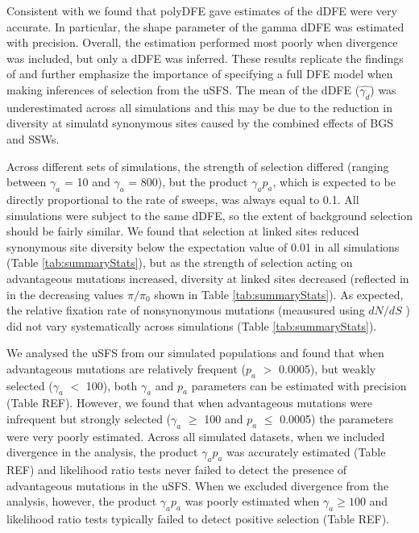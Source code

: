 \documentclass[11pt]{article}
\begin{document}
	Consistent with \cite{RN354}  we found that polyDFE gave estimates of the dDFE were very accurate. In particular, the shape parameter of the gamma dDFE was estimated with precision. Overall, the estimation performed most poorly when divergence was included, but only a dDFE was inferred. These results replicate the findings of \cite{RN354} and further emphasize the importance of specifying a full DFE model when making inferences of selection from the uSFS. The mean of the dDFE ($\hat{\gamma_d}$) was underestimated across all simulations and this may be due to the reduction in diversity at simulatd synonymous sites caused by the combined effects of BGS and SSWs.
	
	Across different sets of simulations, the strength of selection differed (ranging between $\gamma_a$ = 10 and $\gamma_a$ = 800), but the product $\gamma_a p_a$, which is expected to be directly proportional to the rate of sweeps, was always equal to 0.1. All simulations were subject to the same dDFE, so the extent of background selection should be fairly similar. We found that selection at linked sites reduced synonymous site diversity below the expectation value of 0.01 in all simulations (Table \ref{tab:summaryStats}),  but as the strength of selection acting on advantageous mutations increased, diversity at linked sites decreased (reflected in in the decreasing values $\pi/\pi_0$ shown in Table \ref{tab:summaryStats}). As expected, the relative fixation rate of nonsynonymous mutations (meausured using  $dN/dS$ ) did not vary systematically across simulations (Table \ref{tab:summaryStats}).
	
	 We analysed the uSFS from our simulated populations and found that when advantageous mutations are relatively frequent ($p_a$ $>$ 0.0005), but weakly selected ($\gamma_a$ $<$ 100), both $\gamma_a$ and $p_a$ parameters can be estimated with precision (Table REF). However, we found that when advantageous mutations were infrequent but strongly selected ($\gamma_a$ $\geq$ 100 and $p_a$ $\leq$ 0.0005) the parameters were very poorly estimated. Across all simulated datasets, when we included divergence in the analysis, the product $\gamma_a p_a$ was accurately estimated (Table REF) and likelihood ratio tests never failed to detect the presence of advantageous mutations in the uSFS. When we excluded divergence from the analysis, however, the product  $\gamma_a p_a$  was poorly estimated when $\gamma_a \geq 100$ and likelihood ratio tests typically failed to detect positive selection (Table REF).
	
\end{document}
